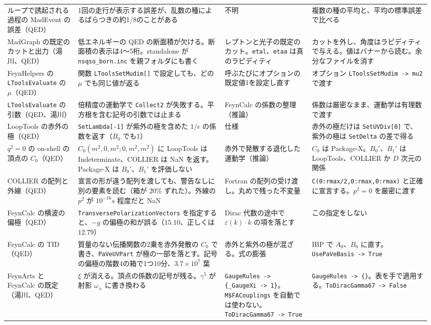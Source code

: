 \documentclass[a4paper,10pt]{ltjsarticle}
\begin{document}
\begin{table}[p]
\begin{tabularx}{\linewidth}{>{\raggedright\arraybackslash}p{2.4cm}>{\raggedright\arraybackslash}X>{\raggedright\arraybackslash}X>{\raggedright\arraybackslash}X}
ループで誘起される過程の MadEvent の誤差（QED） & 1回の走行が表示する誤差が、乱数の種によるばらつきの約1/8のことがある & 不明 & 複数の種の平均と、平均の標準誤差で比べる \\
MadGraph の既定のカットと出力（湯川、QED） & 低エネルギーの QED の断面積が欠ける。断面積の表示は4〜5桁。standalone が \texttt{nsqso\_born.inc} を親フォルダにも書く & レプトンと光子の既定のカット。\texttt{etal}、\texttt{etaa} は真のラピディティ & カットを外し、角度はラピディティで与える。値はバナーから読む。余分なファイルを消す \\
FeynHelpers の \texttt{LToolsEvaluate} の $\mu$（QED） & 関数 \texttt{LToolsSetMudim[]} で設定しても、どの $\mu$ でも同じ値が返る & 呼ぶたびにオプションの既定値1を設定し直す & オプション \texttt{LToolsSetMudim -> mu2} で渡す \\
\texttt{LToolsEvaluate} の引数（QED、湯川） & 倍精度の運動学で \texttt{Collect2} が失敗する。平方根を含む記号の引数では止まる & FeynCalc の係数の整理（推論） & 係数は厳密なまま、運動学は有理数で渡す \\
LoopTools の赤外の極（QED） & \texttt{SetLambda[-1]} が紫外の極を含めた $1/\epsilon$ の係数を返す（$B_0$ でも1） & 仕様 & 赤外の極だけは \texttt{SetUVDiv[0]} で、紫外の極は \texttt{SetDelta} の差で得る \\
$q^2=0$ の on-shell の頂点の $C_0$（QED） & $C_0(m^2,0,m^2;0,m^2,m^2)$ に LoopTools は Indeterminate、COLLIER は NaN を返す。Package-X は $B_0'$、$B_1'$ を評価しない & 赤外で発散する退化した運動学（推論） & $C_0$ は Package-X。$B_0'$、$B_1'$ は LoopTools、COLLIER か $D$ 次元の関係 \\
COLLIER の配列と外線（QED） & 宣言の形が違う配列を渡しても、警告なしに別の要素を読む（箱が $20\%$ ずれた）。外線の $p^2$ が $10^{-16}s$ 程度だと NaN & Fortran の配列の受け渡し。丸めで残った不変量 & \texttt{C(0:rmax/2,0:rmax,0:rmax)} と正確に宣言する。$p^2=0$ を厳密に渡す \\
FeynCalc の横波の偏極（QED） & \texttt{Transverse\allowbreak PolarizationVectors} を指定すると、$-g$ の偏極の和が誤る（$15.10$、正しくは $12.79$） & Dirac 代数の途中で $\varepsilon(k)\cdot k$ の項を落とす & この指定をしない \\
FeynCalc の TID（QED） & 質量のない伝播関数の2乗を赤外発散の $C_0$ で書き、\texttt{PaVeUVPart} が極の一部を落とす。記号の偏極の階数4の箱で1つ10分、$3.7\times10^7$ 葉 & 赤外と紫外の極が混ざる。式の膨張 & IBP で $A_0$、$B_0$ に直す。\texttt{UsePaVeBasis -> True} \\
FeynArts と FeynCalc の既定（湯川、QED） & $\xi$ が消える。頂点の係数の記号が残る。$\gamma^5$ が射影 $\omega_\pm$ に書き換わる & \texttt{GaugeRules -> \{\_GaugeXi -> 1\}}。\texttt{M\$FACouplings} を自動では使わない。\texttt{ToDiracGamma67 -> True} & \texttt{GaugeRules -> \{\}}。表を手で適用する。\texttt{ToDiracGamma67 -> False} \\

\end{tabularx}
\end{table}
\end{document}
